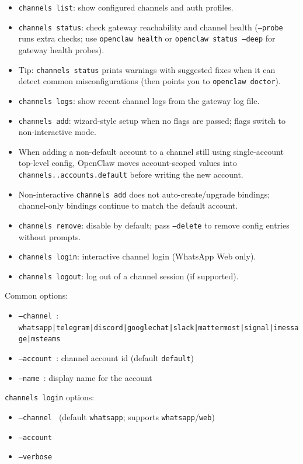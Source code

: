 \begin{itemize}
  \item \texttt{channels list}: show configured channels and auth profiles.
  \item \texttt{channels status}: check gateway reachability and channel health (\texttt{--probe} runs extra checks; use \texttt{openclaw health} or \texttt{openclaw status --deep} for gateway health probes).
  \item Tip: \texttt{channels status} prints warnings with suggested fixes when it can detect common misconfigurations (then points you to \texttt{openclaw doctor}).
  \item \texttt{channels logs}: show recent channel logs from the gateway log file.
  \item \texttt{channels add}: wizard-style setup when no flags are passed; flags switch to non-interactive mode.
  \item When adding a non-default account to a channel still using single-account top-level config, OpenClaw moves account-scoped values into \texttt{channels..accounts.default} before writing the new account.
  \item Non-interactive \texttt{channels add} does not auto-create/upgrade bindings; channel-only bindings continue to match the default account.
  \item \texttt{channels remove}: disable by default; pass \texttt{--delete} to remove config entries without prompts.
  \item \texttt{channels login}: interactive channel login (WhatsApp Web only).
  \item \texttt{channels logout}: log out of a channel session (if supported).
\end{itemize}


Common options:

\begin{itemize}
  \item \texttt{--channel }: \texttt{whatsapp|telegram|discord|googlechat|slack|mattermost|signal|imessage|msteams}
  \item \texttt{--account }: channel account id (default \texttt{default})
  \item \texttt{--name }: display name for the account
\end{itemize}


\texttt{channels login} options:

\begin{itemize}
  \item \texttt{--channel } (default \texttt{whatsapp}; supports \texttt{whatsapp}/\texttt{web})
  \item \texttt{--account }
  \item \texttt{--verbose}
\end{itemize}


